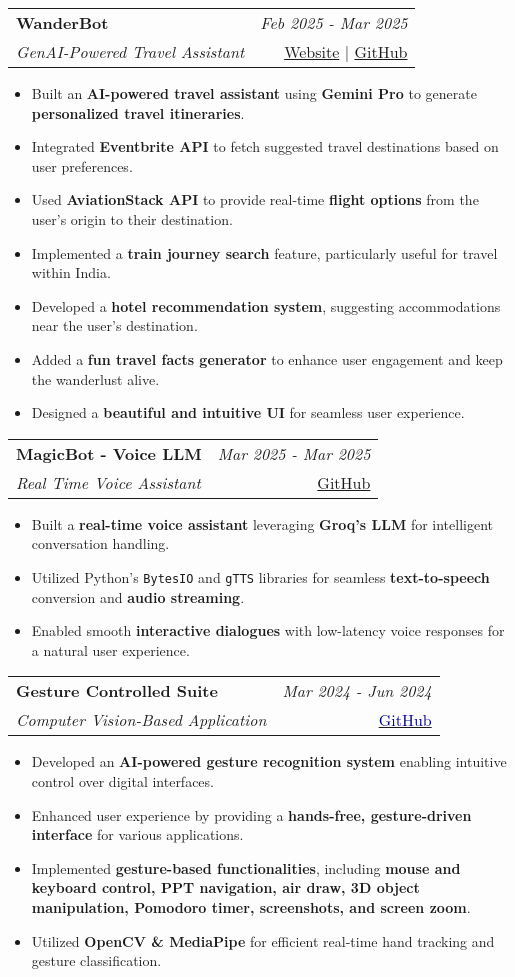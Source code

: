 \documentclass[a4paper,11pt]{article}
\makeatletter
\newcommand{\resumeProject}[4]{
\vspace{0.5mm}\item
    \begin{tabular*}{0.98\textwidth}[t]{l@{\extracolsep{\fill}}r}
        \textbf{#1} & \textit{\footnotesize{#3}} \\
        \footnotesize{\textit{#2}} & \footnotesize{#4}
    \end{tabular*}
    \vspace{-2.4mm}
}
\newcommand{\resumeItemListStart}{\begin{itemize}[leftmargin=*,labelsep=1mm,itemsep=0.5mm]}
\newcommand{\resumeItemListEnd}{\end{itemize}\vspace{-2mm}}
\makeatother
\begin{document}
\resumeProject
    {WanderBot}
    {GenAI-Powered Travel Assistant}
    {Feb 2025 - Mar 2025}
    {\href{https://wanderbot.streamlit.app}{Website} | \href{https://github.com/THE-DEEPDAS/Wanderbot}{GitHub}}
\resumeItemListStart
    \item Built an \textbf{AI-powered travel assistant} using \textbf{Gemini Pro} to generate \textbf{personalized travel itineraries}.
    \item Integrated \textbf{Eventbrite API} to fetch suggested travel destinations based on user preferences.
    \item Used \textbf{AviationStack API} to provide real-time \textbf{flight options} from the user’s origin to their destination.
    \item Implemented a \textbf{train journey search} feature, particularly useful for travel within India.
    \item Developed a \textbf{hotel recommendation system}, suggesting accommodations near the user’s destination.
    \item Added a \textbf{fun travel facts generator} to enhance user engagement and keep the wanderlust alive.
    \item Designed a \textbf{beautiful and intuitive UI} for seamless user experience.
\resumeItemListEnd

\resumeProject
    {MagicBot - Voice LLM}
    {Real Time Voice Assistant}
    {Mar 2025 - Mar 2025}
    {{}\href{https://github.com/THE-DEEPDAS/RealTime-Voice-Assistant}{GitHub}}
\resumeItemListStart
    \item Built a \textbf{real-time voice assistant} leveraging \textbf{Groq's LLM} for intelligent conversation handling.
    \item Utilized Python’s \texttt{BytesIO} and \texttt{gTTS} libraries for seamless \textbf{text-to-speech} conversion and \textbf{audio streaming}.
    \item Enabled smooth \textbf{interactive dialogues} with low-latency voice responses for a natural user experience.
\resumeItemListEnd

\resumeProject
    {Gesture Controlled Suite}
    {Computer Vision-Based Application}
    {Mar 2024 - Jun 2024}
    {{}\href{https://github.com/THE-DEEPDAS/Gesture-Control-Suite}{\textcolor{darkblue}{GitHub}}}
\resumeItemListStart
    \item Developed an \textbf{AI-powered gesture recognition system} enabling intuitive control over digital interfaces.
    \item Enhanced user experience by providing a \textbf{hands-free, gesture-driven interface} for various applications.
    \item Implemented \textbf{gesture-based functionalities}, including \textbf{mouse and keyboard control, PPT navigation, air draw, 3D object manipulation, Pomodoro timer, screenshots, and screen zoom}.
    \item Utilized \textbf{OpenCV \& MediaPipe} for efficient real-time hand tracking and gesture classification.
\resumeItemListEnd
\end{document}
